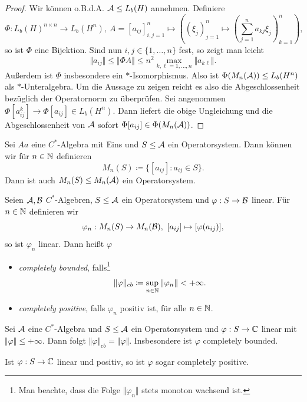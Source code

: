 \begin{proof}
    Wir können o.B.d.A. $\mathcal{A} \leq L_b(H)$ annehmen. Definiere
    \[
        \Phi : L_b(H)^{n \times n} \to L_b(H^n), \ A = [a_{ij}]_{i,j=1}^n \mapsto \left( (\xi_j)_{j=1}^n \mapsto \left( \sum_{j=1}^n a_{kj} \xi_j \right)_{k=1}^n \right),
    \]
    so ist $\Phi$ eine Bijektion. Sind nun $i, j \in \{1, \ldots, n\}$ fest, so zeigt man leicht
    \[
        \Vert a_{ij} \Vert \leq \Vert \Phi A \Vert \leq n^2 \max_{k,\ell=1,\ldots,n} \Vert a_{k \ell} \Vert.
    \]
    Außerdem ist $\Phi$ insbesondere ein $\ast$-Isomorphismus. Also ist $\Phi (M_n(\mathcal{A})) \leq L_b(H^n)$ als $\ast$-Unteralgebra. Um die Aussage zu zeigen reicht es also die Abgeschlossenheit bezüglich der Operatornorm zu überprüfen. Sei angenommen $\Phi [a_{ij}^k] \to \Phi [a_{ij}] \in L_b(H^n)$. Dann liefert die obige Ungleichung und die Abgeschlossenheit von $\mathcal{A}$ sofort $\Phi [a_{ij}] \in \Phi(M_n(\mathcal{A}))$.
\end{proof}

\begin{remark}
    Sei $Aa$ eine $C^*$-Algebra mit Eins und $S \leq \mathcal{A}$ ein Operatorsystem. Dann können wir für $n \in \mathbb{N}$ definieren
    \[
        M_n(S) \coloneqq \{ [a_{ij}] : a_{ij} \in S \}.
    \]
    Dann ist auch $M_n(S) \leq M_n(\mathcal{A})$ ein Operatorsystem.
\end{remark}

\begin{definition}
    Seien $\mathcal{A}, \mathcal{B}$ $C^*$-Algebren, $S \leq \mathcal{A}$ ein Operatorsystem und $\varphi : S \to \mathcal{B}$ linear. Für $n \in \mathbb{N}$ definieren wir
    \[
        \varphi_n : M_n(S) \to M_n(\mathcal{B}), \ [a_{ij}] \mapsto [\varphi(a_{ij})],
    \]
    so ist $\varphi_n$ linear. Dann heißt $\varphi$
    \begin{itemize}
        \item \emph{completely bounded}, falls\footnote{Man beachte, dass die Folge $\Vert \varphi_n \Vert$ stets monoton wachsend ist.}
        \[
            \Vert \varphi \Vert_{cb} \coloneqq \sup_{n \in \mathbb{N}} \Vert \varphi_n \Vert < +\infty.
        \]
        \item \emph{completely positive}, falls $\varphi_n$ positiv ist, für alle $n \in \mathbb{N}$.
    \end{itemize}
\end{definition}

\begin{proposition}
    Sei $\mathcal{A}$ eine $C^*$-Algebra und $S \leq \mathcal{A}$ ein Operatorsystem und $\varphi : S \to \mathbb{C}$ linear mit $\Vert \varphi \Vert \leq +\infty$. Dann folgt $\Vert \varphi \Vert_{cb} = \Vert \varphi \Vert$. Insbesondere ist $\varphi$ completely bounded.

    Ist $\varphi : S \to \mathbb{C}$ linear und positiv, so ist $\varphi$ sogar completely positive.
\end{proposition}

